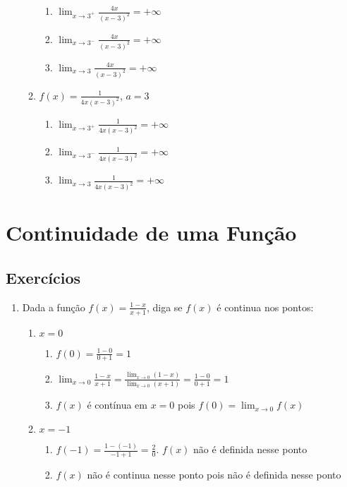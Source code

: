 \documentclass[a4paper, 12pt]{article}
\begin{document}
\begin{enumerate}
\begin{enumerate}
        \begin{enumerate}
            \item $\lim_{x \to 3^+}\frac{4x}{(x-3)^2}=+\infty$
            \item $\lim_{x \to 3^-}\frac{4x}{(x-3)^2}=+\infty$
            \item $\lim_{x \to 3}\frac{4x}{(x-3)^2}=+\infty$
        \end{enumerate}

        \item $f(x) = \frac{1}{4x(x-3)^2}$, $a=3$
        
        \begin{enumerate}
            \item $\lim_{x \to 3^+}\frac{1}{4x(x-3)^2}=+\infty$
            \item $\lim_{x \to 3^-}\frac{1}{4x(x-3)^2}=+\infty$
            \item $\lim_{x \to 3}\frac{1}{4x(x-3)^2}=+\infty$ 
        \end{enumerate}
    \end{enumerate}   
    
\end{enumerate}

\section{Continuidade de uma Função}
\subsection{Exercícios}

\begin{enumerate}
    \newcommand{\naodefinida}{$f(x)$ não é definida nesse ponto}

    \item Dada a função $f(x) = \frac{1-x}{x+1}$, diga se $f(x)$ é continua nos pontos:
    
    \begin{enumerate}
        \item $x = 0$
        
        \begin{enumerate}
            \item $f(0) = \frac{1-0}{0+1} = 1$
            \item $\lim_{x \to 0} \frac{1-x}{x+1} = \frac{\lim_{x \to 0}(1-x)}{\lim_{x \to 0}(x+1)} = \frac{1-0}{0+1} = 1$
            \item $f(x)$ é contínua em $x=0$ pois $f(0) = \lim_{x \to 0}f(x)$
        \end{enumerate}

        \item $x=-1$
        
        \begin{enumerate}
            \item $f(-1) = \frac{1-(-1)}{-1+1} = \frac{2}{0}$. \naodefinida
            \item $f(x)$ não é continua nesse ponto pois não é definida nesse ponto
        \end{enumerate}
    \end{enumerate}
\end{enumerate}
\end{document}

